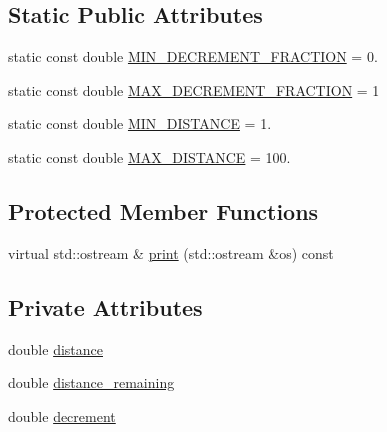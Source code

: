 \subsection*{\-Static \-Public \-Attributes}
\begin{DoxyCompactItemize}
\item 
static const double \hyperlink{classcryomesh_1_1components_1_1ActivityTimerDistance_afb9cf33e702747ecd42d1bfd0c3a3ce3}{\-M\-I\-N\-\_\-\-D\-E\-C\-R\-E\-M\-E\-N\-T\-\_\-\-F\-R\-A\-C\-T\-I\-O\-N} = 0.
\item 
static const double \hyperlink{classcryomesh_1_1components_1_1ActivityTimerDistance_ab24df04f889693641f609aa8f199455f}{\-M\-A\-X\-\_\-\-D\-E\-C\-R\-E\-M\-E\-N\-T\-\_\-\-F\-R\-A\-C\-T\-I\-O\-N} = 1
\item 
static const double \hyperlink{classcryomesh_1_1components_1_1ActivityTimerDistance_a549f2e016df32a594092179570ae742d}{\-M\-I\-N\-\_\-\-D\-I\-S\-T\-A\-N\-C\-E} = 1.
\item 
static const double \hyperlink{classcryomesh_1_1components_1_1ActivityTimerDistance_a87e36fd0ad252132017fa1c9664cf2ca}{\-M\-A\-X\-\_\-\-D\-I\-S\-T\-A\-N\-C\-E} = 100.
\end{DoxyCompactItemize}
\subsection*{\-Protected \-Member \-Functions}
\begin{DoxyCompactItemize}
\item 
virtual std\-::ostream \& \hyperlink{classcryomesh_1_1components_1_1ActivityTimerDistance_a6e109b8f4ddcf6d4e24f0347d4060f78}{print} (std\-::ostream \&os) const 
\end{DoxyCompactItemize}
\subsection*{\-Private \-Attributes}
\begin{DoxyCompactItemize}
\item 
double \hyperlink{classcryomesh_1_1components_1_1ActivityTimerDistance_a191b202e783b14973aa327c460cdc46e}{distance}
\item 
double \hyperlink{classcryomesh_1_1components_1_1ActivityTimerDistance_a0e793c735a10edd18fa12a019dcf8c22}{distance\-\_\-remaining}
\item 
double \hyperlink{classcryomesh_1_1components_1_1ActivityTimerDistance_a81f6c8dffa1dbe89e7e3d67603f84b9a}{decrement}
\end{DoxyCompactItemize}
